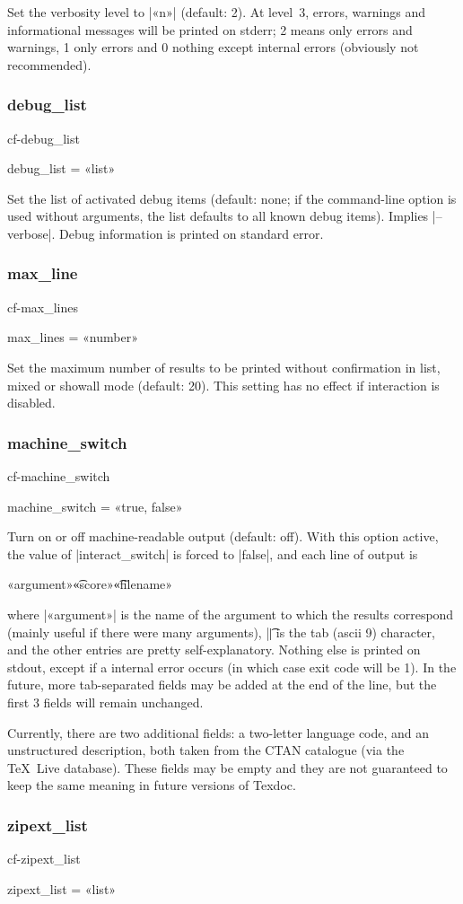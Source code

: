 \documentclass[a4paper, oneside]{scrartcl}
\makeatletter
\newcommand\texlive{\TeX~Live\xspace}
\newif\ifframed
\newenvironment{cmdsubsub}[2]{%
  \framedfalse \commandes\subsubsection{#1}{#2}%
  }{%
  \endcommandes}
\newenvironment{htcode}{%
  \SaveVerbatim[samepage, gobble=2]{verbmat}%
  }{%
  \endSaveVerbatim
  \par\medskip\noindent\hspace*{\parindent}%
  \BUseVerbatim{verbmat}%
  \par\medskip\@endpetrue}
\makeatother
\begin{document}
Set the verbosity level to |«n»| (default: 2). At level~3, errors, warnings and
informational messages will be printed on stderr; 2 means only errors and
warnings, 1 only errors and 0 nothing except internal errors (obviously not
recommended).

\begin{cmdsubsub}{debug_list}{cf-debug_list}
  debug_list = «list»
\end{cmdsubsub}

Set the list of activated debug items (default: none; if the command-line
option is used without arguments, the list defaults to all known debug items).
Implies |--verbose|. Debug information is printed on standard error.

\begin{cmdsubsub}{max_line}{cf-max_lines}
  max_lines = «number»
\end{cmdsubsub}

Set the maximum number of results to be printed without confirmation in list,
mixed or showall mode (default: 20). This setting has no effect if interaction
is disabled.

\begin{cmdsubsub}{machine_switch}{cf-machine_switch}
  machine_switch = «true, false»
\end{cmdsubsub}

Turn on or off machine-readable output (default: off).  With this option
active, the value of |interact_switch| is forced to |false|, and each line of
output is
\begin{htcode}
  «argument»\t«score»\t«filename»
\end{htcode}
where |«argument»| is the name of the argument to which the results correspond
(mainly useful if there were many arguments), |\t| is the tab (ascii 9)
character, and the other entries are pretty self-explanatory. Nothing else is
printed on stdout, except if a internal error occurs (in which case exit code
will be 1). In the future, more tab-separated fields may be added at the end
of the line, but the first 3 fields will remain unchanged.

Currently, there are two additional fields: a two-letter language code, and an
unstructured description, both taken from the CTAN catalogue (via the \texlive
database). These fields may be empty and they are not guaranteed to keep the
same meaning in future versions of Texdoc.

\begin{cmdsubsub}{zipext_list}{cf-zipext_list}
  zipext_list = «list»
\end{cmdsubsub}
\end{document}
